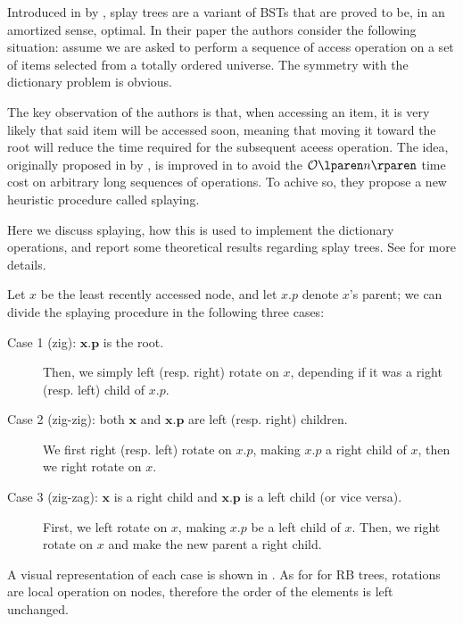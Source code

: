 \documentclass{subfiles}
\begin{document}
\label{sec:splay-trees}
    Introduced in \cite{SleatorT1985b} by \citeauthor{SleatorT1985b},
        splay trees are a variant of BSTs that are proved to be, in an amortized sense, optimal.
        In their paper the authors consider the following situation: 
        assume we are asked to perform a sequence of access operation on a set of items 
        selected from a totally ordered universe.
        The symmetry with the dictionary problem is obvious.

    The key observation of the authors is that, when accessing an item, 
        it is very likely that said item will be accessed soon,
        meaning that moving it toward the root will reduce the time required for the subsequent aceess operation.
        The idea, originally proposed in \cite{Bitner1979} by \citeauthor{Bitner1979},
        is improved in \cite{SleatorT1985b} to avoid the \(\ofO{n}\) time cost on
        arbitrary long sequences of operations. To achive so, they propose a new heuristic procedure 
        called splaying.

    Here we discuss splaying, how this is used to implement the dictionary operations, 
        and report some theoretical results regarding splay trees.
        See \cite{SleatorT1985b,Tarjan1983} for more details.

    Let \(x\) be the least recently accessed node, and let \(x.p\) denote \(x\)'s parent;
        we can divide the splaying procedure in the following three cases:
        \begin{description}
            \item [Case 1 (zig):  \(\mathbf{x.p}\) is the root.]
                Then, we simply left (resp. right) rotate on \(x\), depending if it was a right (resp. left)
                child of \(x.p\).

            \item [Case 2 (zig-zig): both \(\mathbf{x}\) and \(\mathbf{x.p}\) are left (resp. right) children.]
                We first right (resp. left) rotate on \(x.p\), making \(x.p\) a right child of \(x\),
                then we right rotate on \(x\).

            \item [Case 3 (zig-zag): \(\mathbf{x}\) is a right child and \(\mathbf{x.p}\) is a left child (or vice versa).]
                First, we left rotate on \(x\), making \(x.p\) be a left child of \(x\). Then,
                we right rotate on \(x\) and make the new parent a right child.
        \end{description}
        A visual representation of each case is shown in .
        As for for RB trees, rotations are local operation on nodes, 
        therefore the order of the elements is left unchanged.
\end{document}
